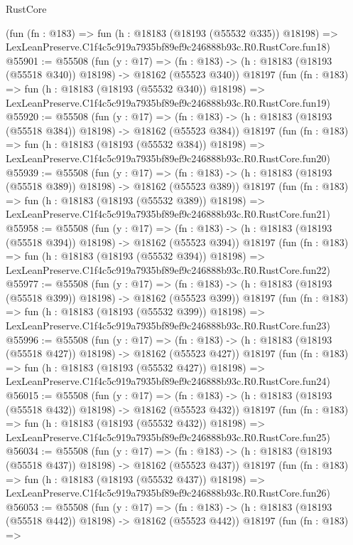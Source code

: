 \begin{lexlean}{RustCore}
\begin{coremodule}
    (fun (fn : @183) =>
    fun (h : @18183 (@18193 (@55532 @335)) @18198) =>
    LexLeanPreserve.C1f4c5c919a7935bf89ef9c246888b93c.R0.RustCore.fun18)
@55901 := @55508
    (fun (y : @17) =>
    (fn : @183) -> (h : @18183 (@18193 (@55518 @340)) @18198) -> @18162 (@55523 @340))
    @18197
    (fun (fn : @183) =>
    fun (h : @18183 (@18193 (@55532 @340)) @18198) =>
    LexLeanPreserve.C1f4c5c919a7935bf89ef9c246888b93c.R0.RustCore.fun19)
@55920 := @55508
    (fun (y : @17) =>
    (fn : @183) -> (h : @18183 (@18193 (@55518 @384)) @18198) -> @18162 (@55523 @384))
    @18197
    (fun (fn : @183) =>
    fun (h : @18183 (@18193 (@55532 @384)) @18198) =>
    LexLeanPreserve.C1f4c5c919a7935bf89ef9c246888b93c.R0.RustCore.fun20)
@55939 := @55508
    (fun (y : @17) =>
    (fn : @183) -> (h : @18183 (@18193 (@55518 @389)) @18198) -> @18162 (@55523 @389))
    @18197
    (fun (fn : @183) =>
    fun (h : @18183 (@18193 (@55532 @389)) @18198) =>
    LexLeanPreserve.C1f4c5c919a7935bf89ef9c246888b93c.R0.RustCore.fun21)
@55958 := @55508
    (fun (y : @17) =>
    (fn : @183) -> (h : @18183 (@18193 (@55518 @394)) @18198) -> @18162 (@55523 @394))
    @18197
    (fun (fn : @183) =>
    fun (h : @18183 (@18193 (@55532 @394)) @18198) =>
    LexLeanPreserve.C1f4c5c919a7935bf89ef9c246888b93c.R0.RustCore.fun22)
@55977 := @55508
    (fun (y : @17) =>
    (fn : @183) -> (h : @18183 (@18193 (@55518 @399)) @18198) -> @18162 (@55523 @399))
    @18197
    (fun (fn : @183) =>
    fun (h : @18183 (@18193 (@55532 @399)) @18198) =>
    LexLeanPreserve.C1f4c5c919a7935bf89ef9c246888b93c.R0.RustCore.fun23)
@55996 := @55508
    (fun (y : @17) =>
    (fn : @183) -> (h : @18183 (@18193 (@55518 @427)) @18198) -> @18162 (@55523 @427))
    @18197
    (fun (fn : @183) =>
    fun (h : @18183 (@18193 (@55532 @427)) @18198) =>
    LexLeanPreserve.C1f4c5c919a7935bf89ef9c246888b93c.R0.RustCore.fun24)
@56015 := @55508
    (fun (y : @17) =>
    (fn : @183) -> (h : @18183 (@18193 (@55518 @432)) @18198) -> @18162 (@55523 @432))
    @18197
    (fun (fn : @183) =>
    fun (h : @18183 (@18193 (@55532 @432)) @18198) =>
    LexLeanPreserve.C1f4c5c919a7935bf89ef9c246888b93c.R0.RustCore.fun25)
@56034 := @55508
    (fun (y : @17) =>
    (fn : @183) -> (h : @18183 (@18193 (@55518 @437)) @18198) -> @18162 (@55523 @437))
    @18197
    (fun (fn : @183) =>
    fun (h : @18183 (@18193 (@55532 @437)) @18198) =>
    LexLeanPreserve.C1f4c5c919a7935bf89ef9c246888b93c.R0.RustCore.fun26)
@56053 := @55508
    (fun (y : @17) =>
    (fn : @183) -> (h : @18183 (@18193 (@55518 @442)) @18198) -> @18162 (@55523 @442))
    @18197
    (fun (fn : @183) =>

\end{coremodule}
\end{lexlean}
